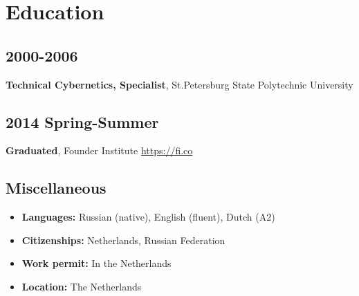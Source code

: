 \section*{Education}

\subsection*{2000-2006}
\textbf{Technical Cybernetics, Specialist}, St.Petersburg State Polytechnic University

\subsection*{2014 Spring-Summer}
\textbf{Graduated}, Founder Institute \href{https://fi.co}{\url{https://fi.co}}

\subsection*{Miscellaneous}
\begin{itemize}[noitemsep, nosep]
  \item \textbf{Languages:} Russian (native), English (fluent), Dutch (A2)
  \item \textbf{Citizenships:} Netherlands, Russian Federation
  \item \textbf{Work permit:} In the Netherlands
  \item \textbf{Location:} The Netherlands
\end{itemize}

